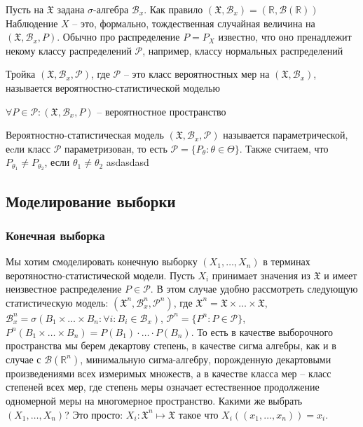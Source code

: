 \documentclass[document.tex]{subfiles}
\begin{document}
\begin{remark}
	Пусть на $\mathfrak{X}$ задана $\sigma$-алгебра $\mathcal{B}_x$. Как правило $(\mathfrak{X}, \mathcal{B}_x) = (\mathbb{R}, \mathcal{B}(\mathbb{R}))$
	Наблюдение $X$ -- это, формально, тождественная случайная величина на $(\mathfrak{X}, \mathcal{B}_x, P)$. Обычно про распределение $P = P_X$ известно,
	что оно пренадлежит некому классу распределений $\mathcal{P}$, например, классу нормальных распределений
\end{remark}

\begin{definition}
	Тройка $(\mathfrak{X}, \mathcal{B}_x, \mathcal{P})$, где $\mathcal{P}$ -- это класс вероятностных мер на $(\mathfrak{X}, \mathcal{B}_x)$, называется
	вероятностно-статистической моделью
\end{definition}

\begin{remark}
	$\forall P \in \mathcal{P}: (\mathfrak{X}, \mathcal{B}_x, P)$ -- вероятностное пространство
\end{remark}

\begin{definition}
	Вероятностно-статистическая модель $(\mathfrak{X}, \mathcal{B}_x, \mathcal{P})$ называется параметрической, еcли класс $\mathcal{P}$ параметризован,
	то есть $\mathcal{P} = \{P_{\theta} : \theta \in \Theta\}$. Также считаем, что $P_{\theta_1} \neq P_{\theta_2}$, если $\theta_1 \neq \theta_2$
    asdasdasd
\end{definition}

\subsection{Моделирование выборки}
\subsubsection{Конечная выборка}
Мы хотим смоделировать конечную выборку $(X_1, \dots, X_n)$ в терминах веротяностно-статистической модели. Пусть $X_i$ принимает значения из $\mathfrak{X}$ и имеет
неизвестное распределение $P \in \mathcal{P}$. В этом случае удобно рассмотреть следующую статистическую модель: $(\mathfrak{X}^n, \mathcal{B}_x^n, \mathcal{P}^n)$, где $\mathfrak{X}^n = \mathfrak{X} \times \ldots \times \mathfrak{X}$, $\mathcal{B}_x^n = \sigma(B_1 \times \ldots \times B_n : \forall i : B_i \in \mathcal{B}_x)$,
$\mathcal{P}^n = \{P^n : P \in \mathcal{P}\}$, $P^n(B_1 \times \ldots \times B_n) = P(B_1) \cdot \ldots \cdot P(B_n)$. То есть в качестве выборочного пространства мы берем декартову степень, в качестве сигма алгебры, как и в случае с $\mathcal{B}(\mathbb{R}^n)$, минимальную сигма-алгебру, порожденную декартовыми произведениями всех измеримых множеств, а в качестве класса мер -- класс степеней всех мер, где степень меры означает естественное продолжение одномерной меры на многомерное пространство. Какими же выбрать $(X_1, \dots, X_n)$? Это просто: $X_i : \mathfrak{X}^n \mapsto \mathfrak{X}$ такое что $X_i((x_1, \dots, x_n)) = x_i$.
\end{document}

